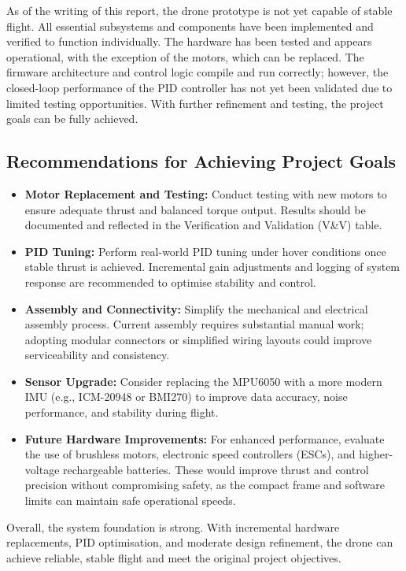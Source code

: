 As of the writing of this report, the drone prototype is not yet capable of stable flight. All essential subsystems and components have been implemented and verified to function individually. The hardware has been tested and appears operational, with the exception of the motors, which can be replaced. The firmware architecture and control logic compile and run correctly; however, the closed-loop performance of the PID controller has not yet been validated due to limited testing opportunities. With further refinement and testing, the project goals can be fully achieved.

\subsection*{Recommendations for Achieving Project Goals}

\begin{itemize}
    \item \textbf{Motor Replacement and Testing:} Conduct testing with new motors to ensure adequate thrust and balanced torque output. Results should be documented and reflected in the Verification and Validation (V\&V) table.
    
    \item \textbf{PID Tuning:} Perform real-world PID tuning under hover conditions once stable thrust is achieved. Incremental gain adjustments and logging of system response are recommended to optimise stability and control.
    
    \item \textbf{Assembly and Connectivity:} Simplify the mechanical and electrical assembly process. Current assembly requires substantial manual work; adopting modular connectors or simplified wiring layouts could improve serviceability and consistency.
    
    \item \textbf{Sensor Upgrade:} Consider replacing the MPU6050 with a more modern IMU (e.g., ICM-20948 or BMI270) to improve data accuracy, noise performance, and stability during flight.
    
    \item \textbf{Future Hardware Improvements:} For enhanced performance, evaluate the use of brushless motors, electronic speed controllers (ESCs), and higher-voltage rechargeable batteries. These would improve thrust and control precision without compromising safety, as the compact frame and software limits can maintain safe operational speeds.
\end{itemize}

Overall, the system foundation is strong. With incremental hardware replacements, PID optimisation, and moderate design refinement, the drone can achieve reliable, stable flight and meet the original project objectives.
